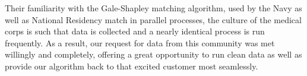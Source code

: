 Their familiarity with the Gale-Shapley matching algorithm, used by the Navy as well as National Residency match in parallel processes, the culture of the medical corps is such that data is collected and a nearly identical process is run frequently.  As a result, our request for data from this community was met willingly and completely, offering a great opportunity to run clean data as well as provide our algorithm back to that excited customer most seamlessly. 




